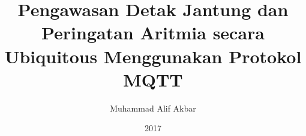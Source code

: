 \documentclass[a4paper,12pt,oneside]{book}
\title{Pengawasan Detak Jantung dan Peringatan Aritmia secara Ubiquitous Menggunakan Protokol MQTT}\let\Title\@title   %
\author{Muhammad Alif Akbar}  \let\Author\@author  %
\date{2017}           \let\Date\@date %
\newif\iflogTA
\begin{document}
\begin{titlepage}
\thispagestyle{empty}

\pagebreak
\thispagestyle{empty}

\pagebreak
\thispagestyle{empty}

\pagebreak
\end{titlepage}

\iflogTA
\pagebreak
\addcontentsline{toc}{chapter}{Abstract}

\pagebreak
\addcontentsline{toc}{chapter}{Lembar Persembahan}

\pagebreak
\addcontentsline{toc}{chapter}{Kata Pengantar}

\pagebreak
\fi
\cleardoublepage
{}
\tableofcontents
\iflogTA
\newpage
\cleardoublepage
\addcontentsline{toc}{chapter}{Daftar Gambar}
\listoffigures
\newpage
\cleardoublepage
\addcontentsline{toc}{chapter}{Daftar Tabel}
\listoftables
\fi
%
\cleardoublepage
{}

%

%

%

%

%
\cleardoublepage
{}
\printbibliography[title=Daftar Pustaka]
%
\cleardoublepage
{}

\end{document}

